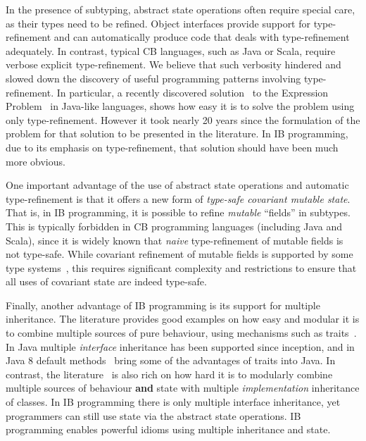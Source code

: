In the presence of subtyping, abstract state operations often require
special care, as their types need to be refined. Object interfaces
provide support for type-refinement and can automatically produce code
that deals with type-refinement adequately. In contrast, typical CB
languages, such as Java or Scala, require verbose explicit
type-refinement. We believe that such verbosity hindered and slowed
down the discovery of useful programming patterns involving
type-refinement. In particular, a recently discovered
solution~\cite{eptrivially} to the Expression
Problem~\cite{wadler98expression} in Java-like languages, shows how easy it is to solve
the problem using only type-refinement. However it took nearly 20
years since the formulation of the problem for that
solution to be presented in the literature. In IB programming, due to
its emphasis on type-refinement, that solution should have been much
more obvious.

One important advantage of the use of abstract state operations and
automatic type-refinement is that it offers a new form of
\emph{type-safe covariant mutable state}. That is, in IB programming,
it is possible to refine \emph{mutable} ``fields'' in subtypes. This is
typically forbidden in CB programming languages (including Java and
Scala), since it is widely known that \emph{naive} type-refinement of
mutable fields is not type-safe. While covariant refinement of mutable
fields is supported by some type systems~\cite{bruce98astatically,bruce1994paradigmatic,ernst06virtual,Saito2013933}, this requires
significant complexity and restrictions to ensure that all uses of
covariant state are indeed type-safe. 

\begin{comment}
\marcoT{%

In this paper we show how to support type-safe
\textbf{field removal},
\textbf{field type refinement} allowing a kind of covariant setters refinement,
and \textbf{multiple inheritance}.}
\end{comment}

Finally, another advantage of IB programming is its support for
multiple inheritance. The literature provides good examples on how
easy and modular it is to combine multiple sources of pure behaviour,
using mechanisms such as traits~\cite{scharli03traits}. In Java
multiple \emph{interface} inheritance has been supported since
inception, and in Java 8 default methods~\cite{goetz12fdefenders} bring some of the
advantages of traits into Java. In contrast, the literature~\cite{Sak89dis,bracha90mixin,malayeri2009cz}
is also rich on how hard it is to modularly combine multiple sources
of behaviour \textbf{and} state with multiple \emph{implementation}
inheritance of classes. In IB programming there is only multiple
interface inheritance, yet programmers can still use state via the
abstract state operations. IB programming enables powerful 
idioms using multiple inheritance and state.

